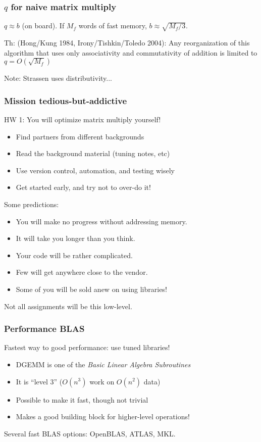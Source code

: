 \documentclass{beamer}
\begin{document}
\begin{frame}
  \frametitle{$q$ for naive matrix multiply}

  $q \approx b$ (on board).  If $M_f$ words of fast memory,
  $b \approx \sqrt{M_f/3}$.

\vspace{1cm}
  Th: (Hong/Kung 1984, Irony/Tishkin/Toledo 2004):
  Any reorganization of this algorithm that uses only associativity
  and commutativity of addition is limited to $q = O(\sqrt{M_f})$

\vspace{1cm}
  Note: Strassen uses distributivity...
\end{frame}


\begin{frame}
  \frametitle{Mission tedious-but-addictive}

  HW 1: You will optimize matrix multiply yourself!
  \begin{itemize}
  \item Find partners from different backgrounds
  \item Read the background material (tuning notes, etc)
  \item Use version control, automation, and testing wisely
  \item Get started early, and try not to over-do it!
  \end{itemize}
  
  \vspace{5mm}
  Some predictions:
  \begin{itemize}
  \item You will make no progress without addressing memory.
  \item It will take you longer than you think.
  \item Your code will be rather complicated.
  \item Few will get anywhere close to the vendor.
  \item Some of you will be sold anew on using libraries!
  \end{itemize}
  Not all assignments will be this low-level.

\end{frame}


\begin{frame}
  \frametitle{Performance BLAS}

  Fastest way to good performance: use tuned libraries!
  \begin{itemize}
  \item DGEMM is one of the {\em Basic Linear Algebra Subroutines}
  \item It is ``level 3'' ($O(n^3)$ work on $O(n^2)$ data)
  \item Possible to make it fast, though not trivial
  \item Makes a good building block for higher-level operations!
  \end{itemize}
  Several fast BLAS options: OpenBLAS, ATLAS, MKL.
\end{frame}
\end{document}
